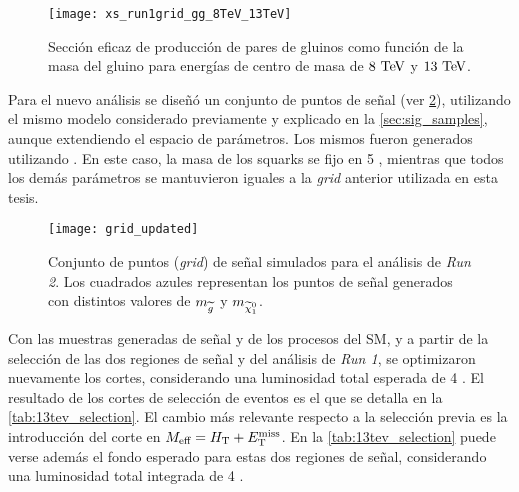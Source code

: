 \begin{figure}[!htb]
  \centering

  \texttt{[image: xs\_run1grid\_gg\_8TeV\_13TeV]}

  \caption{Sección eficaz de producción de pares de gluinos como función de la
    masa del gluino para energías de centro de masa de $8 \tev$ y
    $13 \tev$.}
  \label{fig:13tev_xs}

\end{figure}


Para el nuevo análisis se dise\~nó un conjunto de puntos de se\~nal (ver
\cref{fig:13tev_grid}), utilizando el mismo modelo considerado previamente y
explicado en la \cref{sec:sig_samples}, aunque extendiendo el espacio de
parámetros. Los mismos fueron generados utilizando
{\herwigpp}. En este caso, la masa de los squarks se fijo en 5 \tev, mientras
que todos los demás parámetros se mantuvieron iguales a la \emph{grid} anterior
utilizada en esta tesis.


\begin{figure}[!p]
  \centering

  \texttt{[image: grid\_updated]}

  \caption{Conjunto de puntos (\emph{grid}) de señal simulados para el análisis
    de \emph{Run 2}. Los cuadrados azules representan los puntos de señal
    generados con distintos valores de $m_{\widetilde{g}}$ y $m_{\ninoone}$.}

  \label{fig:13tev_grid}

\end{figure}


Con las muestras generadas de señal y de los procesos del SM, y
a partir de la selección de las dos regiones de señal {\SRL} y {\SRH} del análisis de \emph{Run 1},
se optimizaron nuevamente los cortes, considerando una luminosidad total esperada de 4 \ifb.
El resultado de los cortes de selección de eventos es el que se detalla en la \cref{tab:13tev_selection}.
El cambio más relevante respecto a la selección previa es la introducción del corte en $M_\text{eff} = H_{\mathrm{T}} + E_{\mathrm{T}}^{\mathrm{miss}}$.
En la \cref{tab:13tev_selection} puede verse además el fondo esperado para
estas dos regiones de señal, considerando una luminosidad total integrada de 4 \ifb.

